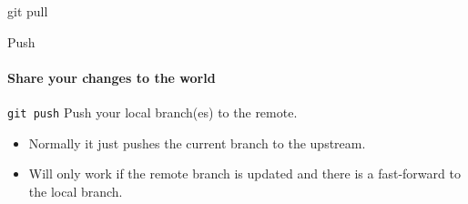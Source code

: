 \documentclass[aspectratio=169]{beamer}
\begin{document}
\begin{frame}{git pull}
\begin{figure}
	\begin{subfigure}[b]{\textwidth}
		\centering
	\end{subfigure}
	
	\begin{subfigure}[b]{\textwidth}
		\centering
	\end{subfigure}
\end{figure}

\end{frame}

\begin{frame}{Push}
\framesubtitle{Share your changes to the world}

\begin{block}{\texttt{git push}}
	Push your local branch(es) to the remote.
\end{block}

\begin{itemize}
	\item Normally it just pushes the current branch to the upstream.
	\item Will only work if the remote branch is updated and there is a fast-forward to the local branch.
\end{itemize}

\end{frame}
\end{document}
